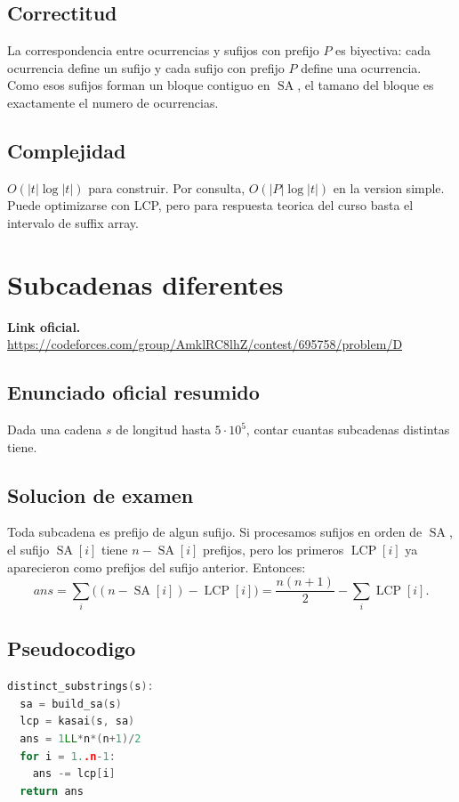 \documentclass[10pt]{article}
\newcommand{\bigO}{O}
\newcommand{\SA}{\operatorname{SA}}
\newcommand{\LCP}{\operatorname{LCP}}
\begin{document}
\subsection{Correctitud}
La correspondencia entre ocurrencias y sufijos con prefijo $P$ es biyectiva:
cada ocurrencia define un sufijo y cada sufijo con prefijo $P$ define una
ocurrencia. Como esos sufijos forman un bloque contiguo en $\SA$, el tamano del
bloque es exactamente el numero de ocurrencias.

\subsection{Complejidad}
$\bigO(|t|\log |t|)$ para construir. Por consulta,
$\bigO(|P|\log |t|)$ en la version simple. Puede optimizarse con LCP, pero para
respuesta teorica del curso basta el intervalo de suffix array.

\newpage

\section{Subcadenas diferentes}
\textbf{Link oficial.} \url{https://codeforces.com/group/AmklRC8lhZ/contest/695758/problem/D}

\subsection{Enunciado oficial resumido}
Dada una cadena $s$ de longitud hasta $5\cdot 10^5$, contar cuantas subcadenas
distintas tiene.

\subsection{Solucion de examen}
Toda subcadena es prefijo de algun sufijo. Si procesamos sufijos en orden de
$\SA$, el sufijo $\SA[i]$ tiene $n-\SA[i]$ prefijos, pero los primeros
$\LCP[i]$ ya aparecieron como prefijos del sufijo anterior. Entonces:
\[
ans=\sum_i \big((n-\SA[i])-\LCP[i]\big)
    =\frac{n(n+1)}2-\sum_i\LCP[i].
\]

\subsection{Pseudocodigo}
\begin{lstlisting}[language=C++]
distinct_substrings(s):
  sa = build_sa(s)
  lcp = kasai(s, sa)
  ans = 1LL*n*(n+1)/2
  for i = 1..n-1:
    ans -= lcp[i]
  return ans
\end{lstlisting}
\end{document}
